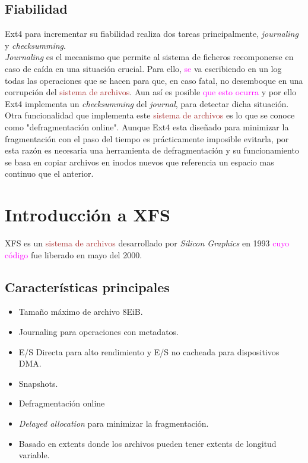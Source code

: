 \subsection{Fiabilidad}
Ext4 para incrementar su fiabilidad realiza dos tareas principalmente, \textit{journaling} y \textit{checksumming}.\\

\textit{Journaling} es el mecanismo que permite al sistema de ficheros recomponerse en caso de caída en una situación crucial. Para ello, \textcolor{magenta}{se} va escribiendo en un log todas las operaciones que se hacen para que, en caso fatal, no desemboque en una corrupción del \textcolor{brown}{sistema de archivos}. Aun así es posible \textcolor{magenta}{que esto ocurra} y por ello Ext4 implementa un \textit{checksumming} del \textit{journal}, para detectar dicha situación.\\

Otra funcionalidad que implementa este \textcolor{brown}{sistema de archivos} es lo que se conoce como "defragmentación online". Aunque Ext4 esta diseñado para minimizar la fragmentación con el paso del tiempo es prácticamente imposible evitarla, por esta razón es necesaria una herramienta de defragmentación y su funcionamiento se basa en copiar archivos en inodos nuevos que referencia un espacio mas continuo que el anterior.


\section{Introducción a XFS}
XFS es un \textcolor{brown}{sistema de archivos} desarrollado por \textit{Silicon Graphics} en 1993 \textcolor{magenta}{cuyo código} fue liberado en mayo del 2000. \cite{xfs}

\subsection{Características principales}
\begin{itemize}
    \item Tamaño máximo de archivo 8EiB.
    \item Journaling para operaciones con metadatos.
    \item E/S Directa para alto rendimiento y E/S no cacheada para dispositivos DMA.
    \item Snapshots.
    \item Defragmentación online
    \item \textit{Delayed allocation} para minimizar la fragmentación.
    \item Basado en extents donde los archivos pueden tener extents de longitud variable.
\end{itemize}

